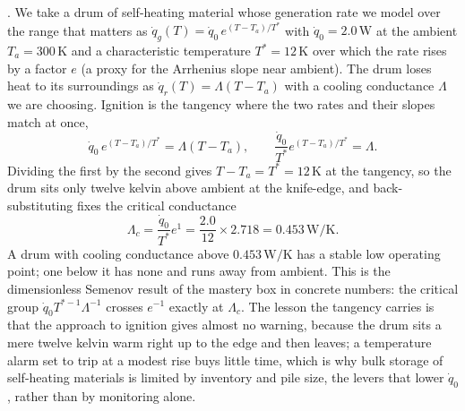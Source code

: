 . We take a drum of
self-heating material whose generation rate we model over the range that
matters as $\dot{q}_g(T) = \dot{q}_0\,e^{(T - T_a)/T^*}$ with $\dot{q}_0 =
2.0\,\text{W}$ at the ambient $T_a = 300\,\si{\kelvin}$ and a characteristic
temperature $T^* = 12\,\si{\kelvin}$ over which the rate rises by a factor
$e$ (a proxy for the Arrhenius slope near ambient). The drum loses heat to
its surroundings as $\dot{q}_r(T) = \Lambda(T - T_a)$ with a cooling
conductance $\Lambda$ we are choosing. Ignition is the tangency where the
two rates and their slopes match at once,
\[
\dot{q}_0\,e^{(T-T_a)/T^*} = \Lambda(T - T_a), \qquad \frac{\dot{q}_0}{T^*}
e^{(T-T_a)/T^*} = \Lambda.
\]
Dividing the first by the second gives $T - T_a = T^* = 12\,\si{\kelvin}$ at
the tangency, so the drum sits only twelve kelvin above ambient at the
knife-edge, and back-substituting fixes the critical conductance
\[
\Lambda_c = \frac{\dot{q}_0}{T^*}e^{1} = \frac{2.0}{12}\times2.718 =
0.453\,\text{W}/\si{\kelvin}.
\]
A drum with cooling conductance above $0.453\,\text{W}/\si{\kelvin}$ has a
stable low operating point; one below it has none and runs away from
ambient. This is the dimensionless Semenov result of the mastery box in
concrete numbers: the critical group $\dot{q}_0 T^{*-1}\Lambda^{-1}$ crosses
$e^{-1}$ exactly at $\Lambda_c$. The lesson the tangency carries is that the
approach to ignition gives almost no warning, because the drum sits a mere
twelve kelvin warm right up to the edge and then leaves; a temperature
alarm set to trip at a modest rise buys little time, which is why bulk
storage of self-heating materials is limited by inventory and pile size,
the levers that lower $\dot{q}_0$, rather than by monitoring alone.

